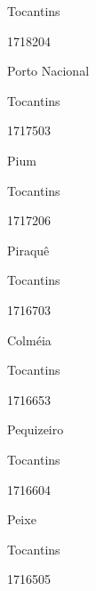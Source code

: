 \documentclass[
  letterpaper,
]{report}
\begin{document}
\n      

Tocantins

\n      

1718204

\n      

Porto Nacional

\n    

\n    

\n      

Tocantins

\n      

1717503

\n      

Pium

\n    

\n    

\n      

Tocantins

\n      

1717206

\n      

Piraquê

\n    

\n    

\n      

Tocantins

\n      

1716703

\n      

Colméia

\n    

\n    

\n      

Tocantins

\n      

1716653

\n      

Pequizeiro

\n    

\n    

\n      

Tocantins

\n      

1716604

\n      

Peixe

\n    

\n    

\n      

Tocantins

\n      

1716505

\n      
\end{document}
